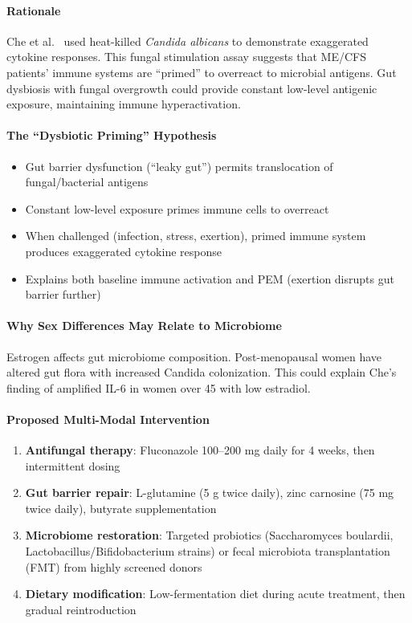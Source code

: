 \paragraph{Rationale}
Che et al.~\cite{Che2025} used heat-killed \emph{Candida albicans} to demonstrate exaggerated cytokine responses. This fungal stimulation assay suggests that ME/CFS patients' immune systems are ``primed'' to overreact to microbial antigens. Gut dysbiosis with fungal overgrowth could provide constant low-level antigenic exposure, maintaining immune hyperactivation.

\paragraph{The ``Dysbiotic Priming'' Hypothesis}
\begin{itemize}
    \item Gut barrier dysfunction (``leaky gut'') permits translocation of fungal/bacterial antigens
    \item Constant low-level exposure primes immune cells to overreact
    \item When challenged (infection, stress, exertion), primed immune system produces exaggerated cytokine response
    \item Explains both baseline immune activation and PEM (exertion disrupts gut barrier further)
\end{itemize}

\paragraph{Why Sex Differences May Relate to Microbiome}
Estrogen affects gut microbiome composition. Post-menopausal women have altered gut flora with increased Candida colonization. This could explain Che's finding of amplified IL-6 in women over 45 with low estradiol.

\paragraph{Proposed Multi-Modal Intervention}
\begin{enumerate}
    \item \textbf{Antifungal therapy}: Fluconazole 100--200 mg daily for 4 weeks, then intermittent dosing
    \item \textbf{Gut barrier repair}: L-glutamine (5 g twice daily), zinc carnosine (75 mg twice daily), butyrate supplementation
    \item \textbf{Microbiome restoration}: Targeted probiotics (Saccharomyces boulardii, Lactobacillus/Bifidobacterium strains) or fecal microbiota transplantation (FMT) from highly screened donors
    \item \textbf{Dietary modification}: Low-fermentation diet during acute treatment, then gradual reintroduction
\end{enumerate}

